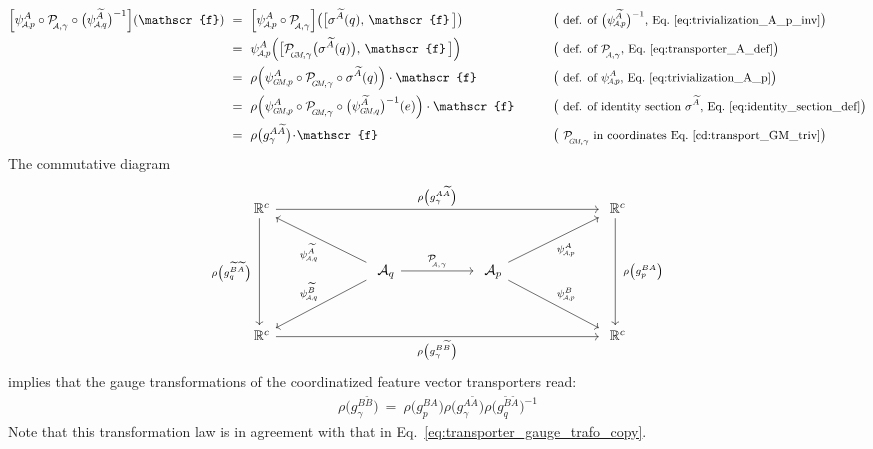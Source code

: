 \begin{alignat}{3}\label{eq:transporter_gauge_A}
    \Big[\psiAp^A \circ \PAgamma \circ \big(\psiAq^{\widetilde{A}}\big)^{-1}\Big] (\mathscr{f})
    \ &=\ \Big[\psiAp^A \circ \PAgamma\Big] \big(\big[\sigma^{\widetilde{A}}(q),\, \mathscr{f}\,\big]\big)
        \qquad && \big( \text{\small def. of $\big(\psiAp^{\widetilde{A}}\big)^{-1}$, Eq.~\eqref{eq:trivialization_A_p_inv}} \big) \\
    \ &=\ \psiAp^A  \Big(\big[\PGMgamma\big(\sigma^{\widetilde{A}}(q)\big),\, \mathscr{f}\,\big]\Big)
        \qquad && \big( \text{\small def. of $\PAgamma$, Eq.~\eqref{eq:transporter_A_def}} \big) \notag \\
    \ &=\ \rho\Big(\psiGMp^A \circ \PGMgamma \circ \sigma^{\widetilde{A}}(q)\Big) \cdot \mathscr{f}
        \qquad && \big( \text{\small def. of $\psiAp^A$, Eq.~\eqref{eq:trivialization_A_p}} \big) \notag \\
    \ &=\ \rho\Big(\psiGMp^A \circ \PGMgamma \circ \big(\psiGMq^{\widetilde{A}}\big)^{-1}(e)\Big) \cdot \mathscr{f}
        \qquad && \big( \text{\small def. of identity section $\sigma^{\widetilde{A}}$, Eq.~\eqref{eq:identity_section_def}} \big) \notag \\
    \ &=\ \rho\big(g_\gamma^{A\widetilde{A}}\big) \!\cdot\! \mathscr{f}
        \qquad && \big( \text{\small $\PGMgamma$ in coordinates Eq.~\eqref{cd:transport_GM_triv}} \big) \notag
\end{alignat}
The commutative diagram
\begin{equation}
\begin{tikzcd}[column sep=65pt, row sep=30, font=\normalsize]
    \R^c
        \arrow[dd, "\rho\big(g_q^{\widetilde{B}\widetilde{A}}\big)\ "']
        \arrow[rrr, "\rho\big(g_\gamma^{A\widetilde{A}}\big)"]
    & &[-3ex] &
    \R^c
        \arrow[dd, "\ \rho\big(g_p^{BA}\big)"]
    \\
    &
    \A_q
        \arrow[ul, "\psiAq^{\widetilde{A}}"]
        \arrow[dl, "\psiAq^{\widetilde{B}}"']
        \arrow[r, "\PAgamma"]
    &
    \A_p
        \arrow[ur, "\psiAp^A"']
        \arrow[dr, "\psiAp^B"]
    \\
    \R^c
        \arrow[rrr, "\rho\big(g_\gamma^{B\widetilde{B}}\big)"']
    & & &
    \R^c
\end{tikzcd}
\end{equation}
implies that the gauge transformations of the coordinatized feature vector transporters read:
\begin{align}
    \rho\big(g_\gamma^{B\widetilde{B}}\big)
    \ =\
    \rho\big(g_p^{BA}\big)
    \rho\big(g_\gamma^{A\widetilde{A}}\big)
    \rho\big(g_q^{\widetilde{B}\widetilde{A}}\big)^{-1}
\end{align}
Note that this transformation law is in agreement with that in Eq.~\eqref{eq:transporter_gauge_trafo_copy}.
